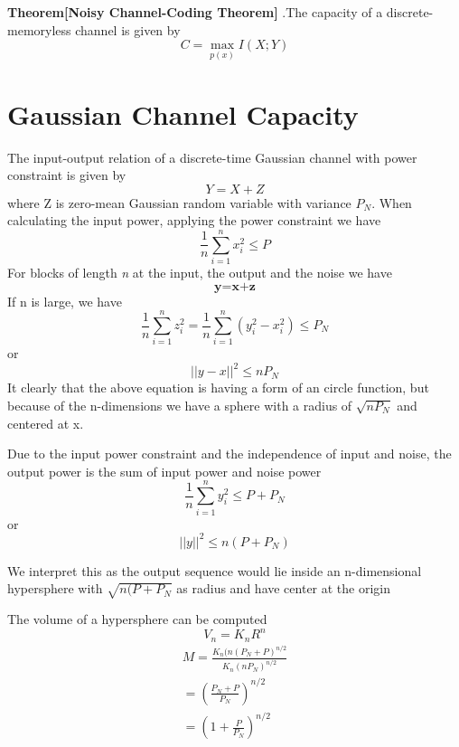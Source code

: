 \documentclass[a4paper, 13pt]{report}
\begin{document}
\par \textbf{Theorem[Noisy Channel-Coding Theorem]} .The capacity of a discrete-memoryless channel is given by
\begin{equation}
    C = \max_{p(x)}I(X;Y)
\end{equation}

\section{Gaussian Channel Capacity}
\par The input-output relation of a discrete-time Gaussian channel with power constraint is given by
\begin{equation}
    Y = X + Z
\end{equation}
where Z is zero-mean Gaussian random variable with variance $P_N$. When calculating the input power, applying the power constraint we have
\begin{equation}
    \frac{1}{n}\sum_{i=1}^{n}x_i^2\leq P
\end{equation}
For blocks of length \textit{n} at the input, the output and the noise we have
\begin{equation}
    \textbf{y=x+z}
\end{equation}
If n is large, we have
\begin{equation}
    \frac{1}{n}\sum_{i=1}^{n}z_i^2=\frac{1}{n}\sum_{i=1}^{n}(y_i^2-x_i^2)\leq P_N
\end{equation}
or
\begin{equation}
    ||y-x||^2 \leq nP_N
\end{equation}
It clearly that the above equation is having a form of an circle function, but because of the n-dimensions we have a sphere with a radius of $\sqrt{nP_N}$ and centered at x.
\par Due to the input power constraint and the independence of input and noise, the output power is the sum of input power and noise power
\begin{equation}
    \frac{1}{n}\sum_{i=1}^{n}y_i^2\leq P+P_N
\end{equation}
or
\begin{equation}
    ||y||^2\leq n(P+P_N)
\end{equation}
\par We interpret this as the output sequence would lie inside an n-dimensional hypersphere with $\sqrt{n(P+P_N}$ as radius and have center at the origin



\par The volume of a hypersphere can be computed 
\begin{equation}
    V_n = K_nR^n
\end{equation}
\begin{equation}
\begin{split}
    M = \frac{K_n(n(P_N+P)^{n/2}}{K_n(nP_N)^{n/2}}\\
    =(\frac{P_N+P}{P_N})^{n/2}\\
    =(1+\frac{P}{P_N})^{n/2}
\end{split}
\end{equation}
\end{document}
